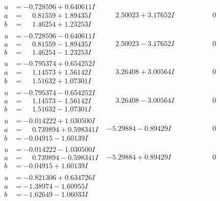 \documentclass[1p]{elsarticle_modified}
\theoremstyle{definition}
\begin{document}
$$\begin{array}{c|c|c}
\begin{aligned}
u &= -0.728596 + 0.640611 I \\
a &= \phantom{-}0.81559 + 1.89435 I \\
b &= \phantom{-}1.46254 + 1.23253 I\end{aligned}
 & \phantom{-}2.50023 + 3.17652 I & \phantom{-0.000000 } 0 \\ \hline\begin{aligned}
u &= -0.728596 - 0.640611 I \\
a &= \phantom{-}0.81559 - 1.89435 I \\
b &= \phantom{-}1.46254 - 1.23253 I\end{aligned}
 & \phantom{-}2.50023 - 3.17652 I & \phantom{-0.000000 } 0 \\ \hline\begin{aligned}
u &= -0.795374 + 0.654252 I \\
a &= \phantom{-}1.14573 + 1.56142 I \\
b &= \phantom{-}1.51632 + 1.07301 I\end{aligned}
 & \phantom{-}3.26408 + 3.00564 I & \phantom{-0.000000 } 0 \\ \hline\begin{aligned}
u &= -0.795374 - 0.654252 I \\
a &= \phantom{-}1.14573 - 1.56142 I \\
b &= \phantom{-}1.51632 - 1.07301 I\end{aligned}
 & \phantom{-}3.26408 - 3.00564 I & \phantom{-0.000000 } 0 \\ \hline\begin{aligned}
u &= -0.014222 + 1.030500 I \\
a &= \phantom{-}0.739894 + 0.598341 I \\
b &= -0.04915 - 1.60139 I\end{aligned}
 & -5.29884 - 0.89429 I & \phantom{-0.000000 } 0 \\ \hline\begin{aligned}
u &= -0.014222 - 1.030500 I \\
a &= \phantom{-}0.739894 - 0.598341 I \\
b &= -0.04915 + 1.60139 I\end{aligned}
 & -5.29884 + 0.89429 I & \phantom{-0.000000 } 0 \\ \hline\begin{aligned}
u &= -0.821306 + 0.634726 I \\
a &= -1.38974 - 1.60955 I \\
b &= -1.62649 - 1.06033 I\end{aligned}

\end{array}$$
\end{document}
